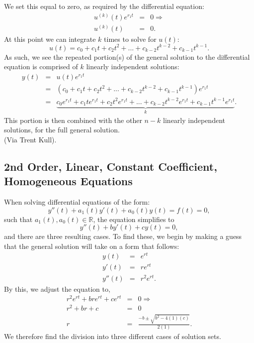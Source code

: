 \documentclass[10pt]{article}
\begin{document}
    We set this equal to zero, as required by the differential equation:
    \begin{eqnarray*}
        u^{(k)}(t)e^{r_1 t} &=& 0 \Rightarrow\\
        u^{(k)}(t)&=&0.
    \end{eqnarray*}
    At this point we can integrate $k$ times to solve for $u(t)$:
    $$u(t)=c_0+c_1 t+c_2 t^2 +...+c_{k-2}t^{k-2}+c_{k-1}t^{k-1}.$$
    As such, we see the repeated portion(s) of the general solution to the differential equation is comprised of $k$ linearly independent solutions:
    \begin{eqnarray*}
        y(t)&=&u(t)e^{r_1 t}\\
        &=&(c_0+c_1 t+c_2 t^2 +...+c_{k-2} t^{k-2} +c_{k-1} t^{k-1})e^{r_1 t}\\
        &=&\underbrace{c_0 e^{r_1 t}+c_1 t e^{r_1 t}+c_2 t^2 e^{r_1 t}+...+c_{k-2} t^{k-2} e^{r_1 t}+c_{k-1} t^{k-1}e^{r_1 t}}_k .
    \end{eqnarray*}
    This portion is then combined with the other $n-k$ linearly independent solutions, for the full general solution.\\
    (Via Trent Kull).
    
    \subsection{2nd Order, Linear, Constant Coefficient, Homogeneous Equations}
    When solving differential equations of the form:
    $$y''(t)+a_1 (t) y'(t)+a_0(t)y(t)=f(t)=0,$$
    such that $a_1(t), a_0(t)\in\mathbb{R}$, the equation simplifies to
    $$y''(t)+by'(t)+cy(t)=0,$$
    and there are three resulting cases. To find these, we begin by making a guess that the general solution will take on a form that follows:
    \begin{eqnarray*}
        y(t)&=&e^{rt}\\
        y'(t)&=&re^{rt}\\
        y''(t)&=&r^2 e^{rt}.
    \end{eqnarray*}
    By this, we adjust the equation to,
    \begin{eqnarray*}
        r^2 e^{rt}+b re^{rt}+ce^{rt}&=&0 \Rightarrow\\
        r^2+br+c&=&0\\
        r&=&\frac{-b\pm \sqrt{b^2-4(1)(c)}}{2(1)}.
    \end{eqnarray*}
    We therefore find the division into three different cases of solution sets.\\
    
\end{document}
